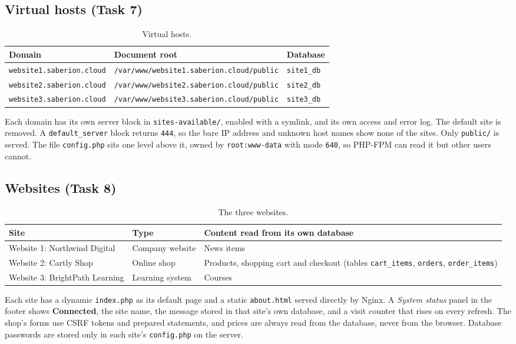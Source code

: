 \documentclass[11pt,a4paper]{article}
\newcommand{\code}[1]{\texttt{#1}}
\begin{document}
\subsection{Virtual hosts (Task 7)}
\begin{table}[H]
\centering
\begin{tabular}{@{}lll@{}}
\toprule
\textbf{Domain} & \textbf{Document root} & \textbf{Database}\\
\midrule
\code{website1.saberion.cloud} & \code{/var/www/website1.saberion.cloud/public} & \code{site1\_db}\\
\code{website2.saberion.cloud} & \code{/var/www/website2.saberion.cloud/public} & \code{site2\_db}\\
\code{website3.saberion.cloud} & \code{/var/www/website3.saberion.cloud/public} & \code{site3\_db}\\
\bottomrule
\end{tabular}
\caption{Virtual hosts.}
\end{table}
Each domain has its own server block in \code{sites-available/}, enabled with a symlink, and
its own access and error log. The default site is removed. A \code{default\_server} block
returns \code{444}, so the bare IP address and unknown host names show none of the sites.
Only \code{public/} is served. The file \code{config.php} sits one level above it, owned by
\code{root:www-data} with mode \code{640}, so PHP-FPM can read it but other users cannot.

\subsection{Websites (Task 8)}
\begin{table}[H]
\centering
\begin{tabular}{@{}p{4.4cm}p{3.3cm}p{6.8cm}@{}}
\toprule
\textbf{Site} & \textbf{Type} & \textbf{Content read from its own database}\\
\midrule
Website 1: Northwind Digital & Company website & News items\\
Website 2: Cartly Shop & Online shop & Products, shopping cart and checkout (tables \code{cart\_items}, \code{orders}, \code{order\_items})\\
Website 3: BrightPath Learning & Learning system & Courses\\
\bottomrule
\end{tabular}
\caption{The three websites.}
\end{table}
Each site has a dynamic \code{index.php} as its default page and a static \code{about.html}
served directly by Nginx. A \emph{System status} panel in the footer shows \textbf{Connected},
the site name, the message stored in that site's own database, and a visit counter that
rises on every refresh. The shop's forms use CSRF tokens and prepared statements, and prices
are always read from the database, never from the browser. Database passwords are stored
only in each site's \code{config.php} on the server.
\end{document}
